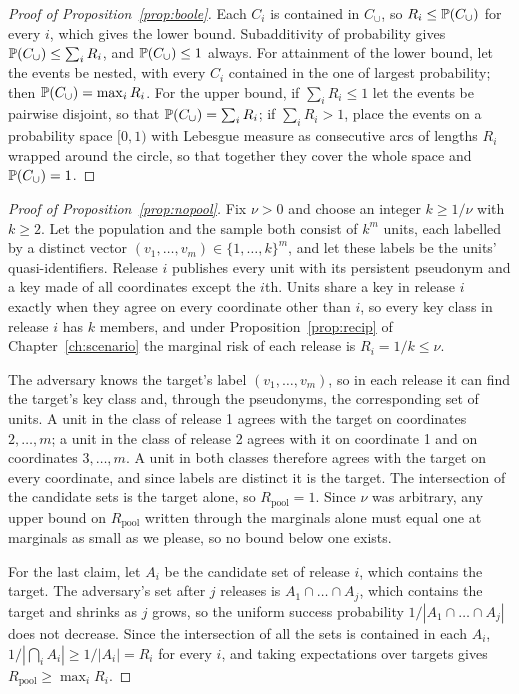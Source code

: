 \begin{proof}[Proof of Proposition~\ref{prop:boole}]
Each $C_i$ is contained in $C_\cup$, so $R_i \le \mathbb{P}(C_\cup)$ for every $i$, which
gives the lower bound. Subadditivity of probability gives
$\mathbb{P}(C_\cup) \le \sum_i R_i$, and $\mathbb{P}(C_\cup) \le 1$ always. For attainment of
the lower bound, let the events be nested, with every $C_i$ contained in the one of
largest probability; then $\mathbb{P}(C_\cup) = \max_i R_i$. For the upper bound, if
$\sum_i R_i \le 1$ let the events be pairwise disjoint, so that
$\mathbb{P}(C_\cup) = \sum_i R_i$; if $\sum_i R_i > 1$, place the events on a probability
space $[0,1)$ with Lebesgue measure as consecutive arcs of lengths $R_i$ wrapped
around the circle, so that together they cover the whole space and
$\mathbb{P}(C_\cup) = 1$.
\end{proof}

\begin{proof}[Proof of Proposition~\ref{prop:nopool}]
Fix $\nu > 0$ and choose an integer $k \ge 1/\nu$ with $k \ge 2$. Let the population
and the sample both consist of $k^m$ units, each labelled by a distinct vector
$(v_1,\dots,v_m) \in \{1,\dots,k\}^m$, and let these labels be the units'
quasi-identifiers. Release $i$ publishes every unit with its persistent pseudonym and
a key made of all coordinates except the $i$th. Units share a key in release $i$
exactly when they agree on every coordinate other than $i$, so every key class in
release $i$ has $k$ members, and under Proposition~\ref{prop:recip} of
Chapter~\ref{ch:scenario} the marginal risk of each release is $R_i = 1/k \le \nu$.

The adversary knows the target's label $(v_1,\dots,v_m)$, so in each release it can
find the target's key class and, through the pseudonyms, the corresponding set of
units. A unit in the class of release 1 agrees with the target on coordinates
$2,\dots,m$; a unit in the class of release 2 agrees with it on coordinate 1 and on
coordinates $3,\dots,m$. A unit in both classes therefore agrees with the target on
every coordinate, and since labels are distinct it is the target. The intersection of
the candidate sets is the target alone, so $R_{\mathrm{pool}} = 1$. Since $\nu$ was
arbitrary, any upper bound on $R_{\mathrm{pool}}$ written through the marginals
alone must equal one at marginals as small as we please, so no bound below one
exists.

For the last claim, let $A_i$ be the candidate set of release $i$, which contains the
target. The adversary's set after $j$ releases is $A_1 \cap \dots \cap A_j$, which
contains the target and shrinks as $j$ grows, so the uniform success probability
$1/|A_1 \cap \dots \cap A_j|$ does not decrease. Since the intersection of all the
sets is contained in each $A_i$, $1/|\bigcap_i A_i| \ge 1/|A_i| = R_i$ for every $i$,
and taking expectations over targets gives $R_{\mathrm{pool}} \ge \max_i R_i$.
\end{proof}

